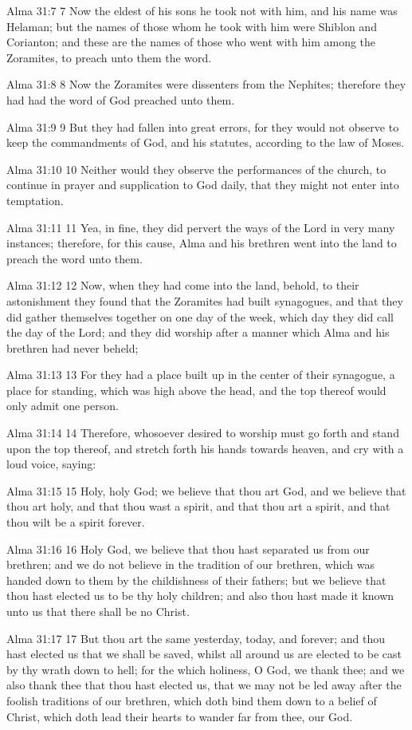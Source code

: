 Alma 31:7
 7 Now the eldest of his sons he took not with him, and his name
was Helaman; but the names of those whom he took with him were
Shiblon and Corianton; and these are the names of those who went
with him among the Zoramites, to preach unto them the word.

Alma 31:8
 8 Now the Zoramites were dissenters from the Nephites; therefore
they had had the word of God preached unto them.

Alma 31:9
 9 But they had fallen into great errors, for they would not
observe to keep the commandments of God, and his statutes,
according to the law of Moses.

Alma 31:10
 10 Neither would they observe the performances of the church, to
continue in prayer and supplication to God daily, that they might
not enter into temptation.

Alma 31:11
 11 Yea, in fine, they did pervert the ways of the Lord in very
many instances; therefore, for this cause, Alma and his brethren
went into the land to preach the word unto them.

Alma 31:12
 12 Now, when they had come into the land, behold, to their
astonishment they found that the Zoramites had built synagogues,
and that they did gather themselves together on one day of the
week, which day they did call the day of the Lord; and they did
worship after a manner which Alma and his brethren had never
beheld;

Alma 31:13
 13 For they had a place built up in the center of their
synagogue, a place for standing, which was high above the head,
and the top thereof would only admit one person.

Alma 31:14
 14 Therefore, whosoever desired to worship must go forth and
stand upon the top thereof, and stretch forth his hands towards
heaven, and cry with a loud voice, saying:

Alma 31:15
 15 Holy, holy God; we believe that thou art God, and we believe
that thou art holy, and that thou wast a spirit, and that thou
art a spirit, and that thou wilt be a spirit forever.

Alma 31:16
 16 Holy God, we believe that thou hast separated us from our
brethren; and we do not believe in the tradition of our brethren,
which was handed down to them by the childishness of their
fathers; but we believe that thou hast elected us to be thy holy
children; and also thou hast made it known unto us that there
shall be no Christ.

Alma 31:17
 17 But thou art the same yesterday, today, and forever; and thou
hast elected us that we shall be saved, whilst all around us are
elected to be cast by thy wrath down to hell; for the which
holiness, O God, we thank thee; and we also thank thee that thou
hast elected us, that we may not be led away after the foolish
traditions of our brethren, which doth bind them down to a belief
of Christ, which doth lead their hearts to wander far from thee,
our God.

